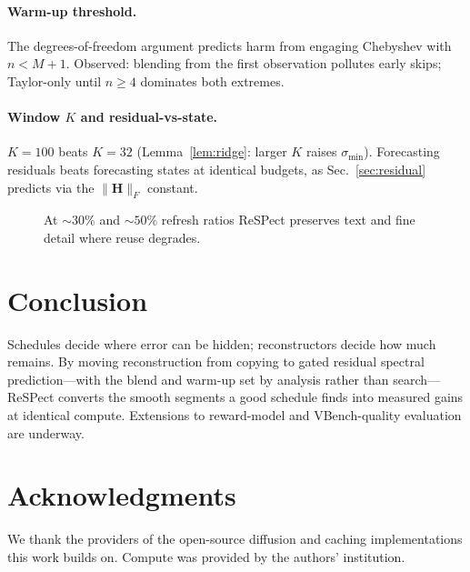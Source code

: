 \documentclass[10pt,twocolumn,letterpaper]{article}
\begin{document}
\paragraph{Warm-up threshold.}
The degrees-of-freedom argument predicts harm from engaging Chebyshev
with $n < M{+}1$. Observed: blending from the first observation pollutes
early skips; Taylor-only until $n \ge 4$ dominates both extremes.

\paragraph{Window $K$ and residual-vs-state.}
$K{=}100$ beats $K{=}32$ (Lemma~\ref{lem:ridge}: larger $K$ raises
$\sigma_{\min}$). Forecasting residuals beats forecasting states at
identical budgets, as Sec.~\ref{sec:residual} predicts via the
$\|\mathbf{H}\|_F$ constant.

\begin{figure}[t]
  \centering
  \caption{At ${\sim}30\%$ and ${\sim}50\%$ refresh ratios ReSPect
  preserves text and fine detail where reuse degrades.}
  \label{fig:qual}
\end{figure}

\section{Conclusion}
\label{sec:conclusion}

Schedules decide where error can be hidden; reconstructors decide how
much remains. By moving reconstruction from copying to gated residual
spectral prediction---with the blend and warm-up set by analysis rather
than search---ReSPect converts the smooth segments a good schedule finds
into measured gains at identical compute. Extensions to reward-model and
VBench-quality evaluation are underway.

\section*{Acknowledgments}
We thank the providers of the open-source diffusion and caching
implementations this work builds on. Compute was provided by the authors'
institution.
\end{document}
